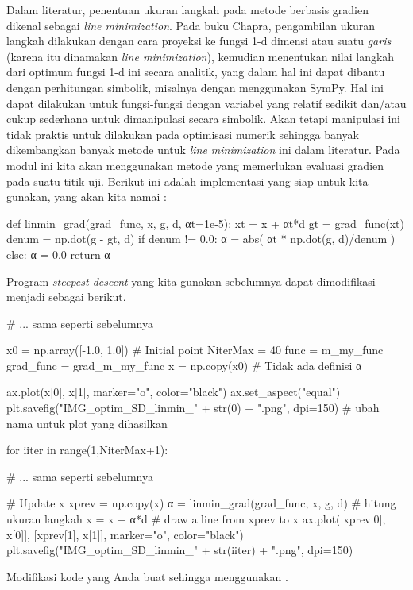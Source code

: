 Dalam literatur, penentuan ukuran langkah pada metode berbasis gradien
dikenal sebagai \textit{line minimization}. Pada buku Chapra, pengambilan ukuran langkah dilakukan dengan cara
proyeksi ke fungsi 1-d dimensi atau suatu \emph{garis} (karena itu dinamakan \textit{line minimization}),
kemudian menentukan nilai langkah
dari optimum fungsi 1-d ini secara analitik, yang dalam hal ini dapat dibantu dengan perhitungan simbolik,
misalnya dengan menggunakan SymPy.
Hal ini dapat dilakukan untuk fungsi-fungsi dengan variabel
yang relatif sedikit dan/atau cukup sederhana untuk dimanipulasi secara simbolik.
Akan tetapi manipulasi ini tidak praktis untuk dilakukan pada optimisasi numerik sehingga
banyak dikembangkan banyak metode untuk \textit{line minimization} ini dalam literatur.
Pada modul ini kita akan menggunakan metode yang memerlukan evaluasi gradien pada suatu titik uji.
Berikut ini adalah implementasi yang siap untuk kita gunakan, yang akan kita namai
:
\begin{pythoncode}
def linmin_grad(grad_func, x, g, d, αt=1e-5):
    xt = x + αt*d
    gt = grad_func(xt)
    denum = np.dot(g - gt, d)
    if denum != 0.0:
        α = abs( αt * np.dot(g, d)/denum )
    else:
        α = 0.0
    return α
\end{pythoncode}

Program \textit{steepest descent} yang kita gunakan sebelumnya dapat dimodifikasi menjadi sebagai
berikut.
\begin{pythoncode}
# ... sama seperti sebelumnya

x0 = np.array([-1.0, 1.0]) # Initial point
NiterMax = 40
func = m_my_func
grad_func = grad_m_my_func
x = np.copy(x0)
# Tidak ada definisi α

ax.plot(x[0], x[1], marker="o", color="black")
ax.set_aspect("equal")
plt.savefig("IMG_optim_SD_linmin_" + str(0) + ".png", dpi=150)
# ubah nama untuk plot yang dihasilkan

for iiter in range(1,NiterMax+1):

    # ... sama seperti sebelumnya

    # Update x
    xprev = np.copy(x)
    α = linmin_grad(grad_func, x, g, d) # hitung ukuran langkah
    x = x + α*d 
    # draw a line from xprev to x
    ax.plot([xprev[0], x[0]], [xprev[1], x[1]], marker="o", color="black")
    plt.savefig("IMG_optim_SD_linmin_" + str(iiter) + ".png", dpi=150)
\end{pythoncode}

\begin{soal}
Modifikasi kode yang Anda buat sehingga menggunakan .
\end{soal}

